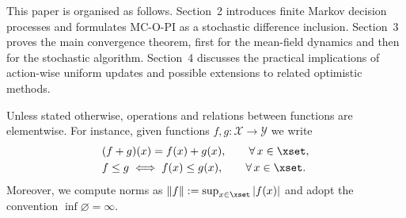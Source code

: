 This paper is organised as follows. Section~2 introduces finite Markov decision
processes and formulates MC-O-PI as a stochastic difference inclusion. Section~3 proves the
main convergence theorem, first for the mean-field dynamics and then for the stochastic
algorithm. Section~4 discusses the practical implications of action-wise uniform updates
and possible extensions to related optimistic methods. 

Unless stated otherwise, operations and relations between functions are elementwise. For instance, given functions $f, g : \mathcal X \to \mathcal Y$ we write
\begin{align*}
&(f + g)(x) = f(x) + g(x), \qquad \forall \, x \in \xset ,
    \\
&f \le g \iff f(x) \le g(x), \qquad \forall \, x \in \xset .
\end{align*}
Moreover, we compute norms as $\|f\| := \sup_{x \in \xset} |f(x)|$ 
and adopt the convention $\inf \varnothing = \infty$.

























































































